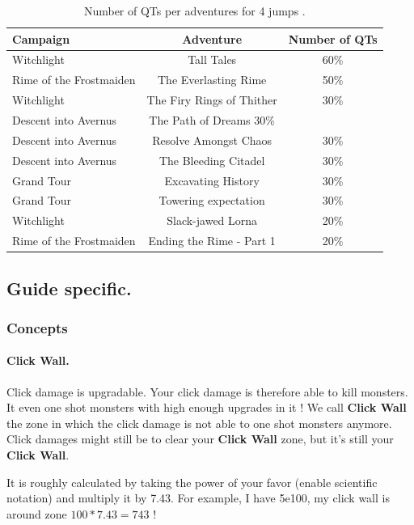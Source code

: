 \documentclass{article}
\begin{document}
\begin{table}[ht!]
\centering
\caption{Number of QTs per adventures for 4 jumps \briv.
}
\label{tbl:fourJumpsQts}
\begin{small}
\begin{tabular}{ l c c }
\toprule
Campaign & Adventure & Number of QTs \\
\midrule
Witchlight & Tall Tales & 60\% \\
Rime of the Frostmaiden & The Everlasting Rime & 50\% \\
Witchlight & The Firy Rings of Thither & 30\% \\
Descent into Avernus & The Path of Dreams 30\% \\
Descent into Avernus & Resolve Amongst Chaos & 30\% \\
Descent into Avernus & The Bleeding Citadel & 30\% \\
Grand Tour & Excavating History & 30\% \\
Grand Tour & Towering expectation & 30\% \\
Witchlight & Slack-jawed Lorna & 20\% \\
Rime of the Frostmaiden & Ending the Rime - Part 1 & 20\% \\
\bottomrule
\end{tabular}
\end{small}
\end{table}

\subsection{Guide specific.}

\subsubsection{Concepts}

\paragraph{Click Wall.}

Click damage is upgradable.
Your click damage is therefore able to kill monsters.
It even one shot monsters with high enough upgrades in it !
We call \textbf{Click Wall} the zone in which the click damage is not able to one shot monsters anymore.
Click damages might still be to clear your \textbf{Click Wall} zone, but it's still your \textbf{Click Wall}.

It is roughly calculated by taking the power of your favor (enable scientific notation) and multiply it by 7.43.
For example, I have 5e100, my click wall is around zone $100 * 7.43 = 743$ !
\end{document}

